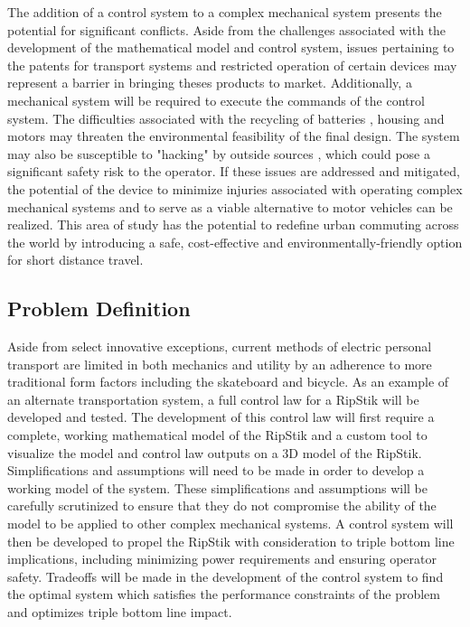 The addition of a control system to a complex mechanical system presents the potential for significant conflicts. 
Aside from the challenges associated with the development of the mathematical model and control system, issues pertaining to the patents for transport systems \cite{casterboardPatent} and restricted operation of certain devices \cite{TOLaws} may represent a barrier in bringing theses products to market. 
Additionally, a mechanical system will be required to execute the commands of the control system. 
The difficulties associated with the recycling of batteries \cite{BatteryRecharge}, housing \cite{PlasticAssessment} and motors may threaten the environmental feasibility of the final design. 
The system may also be susceptible to "hacking" by outside sources \cite{DEFCON}, which could pose a significant safety risk to the operator. 
If these issues are addressed and mitigated, the potential of the device to minimize injuries associated with operating complex mechanical systems and to serve as a viable alternative to motor vehicles can be realized. 
This area of study has the potential to redefine urban commuting across the world by introducing a safe, cost-effective and environmentally-friendly option for short distance travel. 

\subsection{Problem Definition}

Aside from select innovative exceptions, current methods of electric personal transport are limited in both mechanics and utility by an adherence to more traditional form factors including the skateboard and bicycle. 
As an example of an alternate transportation system, a full control law for a RipStik will be developed and tested. 
The development of this control law will first require a complete, working mathematical model of the RipStik and a custom tool to visualize the model and control law outputs on a 3D model of the RipStik. 
Simplifications and assumptions will need to be made in order to develop a working model of the system. 
These simplifications and assumptions will be carefully scrutinized to ensure that they do not compromise the ability of the model to be applied to other complex mechanical systems. 
A control system will then be developed to propel the RipStik with consideration to triple bottom line implications, including minimizing power requirements and ensuring operator safety. 
Tradeoffs will be made in the development of the control system to find the optimal system which satisfies the performance constraints of the problem and optimizes triple bottom line impact. 

